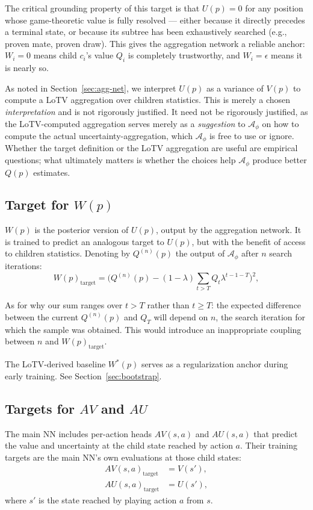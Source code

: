 \documentclass[11pt]{article}
\begin{document}
The critical grounding property of this target is that $U(p) = 0$ for any
position whose game-theoretic value is fully resolved --- either because it
directly precedes a terminal state, or because its subtree has been
exhaustively searched (e.g., proven mate, proven draw). This gives the
aggregation network a reliable anchor: $W_i = 0$ means child $c_i$'s value
$Q_i$ is completely trustworthy, and $W_i = \epsilon$ means it is nearly so.

As noted in Section~\ref{sec:agg-net}, we interpret $U(p)$ as a variance
of $V(p)$ to compute a LoTV aggregation over children statistics. This is
merely a chosen \textit{interpretation} and is not rigorously justified.
It need not be rigorously justified, as the LoTV-computed aggregation serves
merely as a \textit{suggestion} to $\mathcal{A}_\phi$ on how to compute the
actual uncertainty-aggregation, which $\mathcal{A}_\phi$ is free to use or
ignore. Whether the target definition or the LoTV aggregation are useful
are empirical questions; what ultimately matters is
whether the choices help $\mathcal{A}_\phi$ produce better $Q(p)$ estimates.

\subsection{Target for $W(p)$}
\label{sec:Wp}

$W(p)$ is the posterior version of $U(p)$, output by the aggregation network.
It is trained to predict an analogous target to $U(p)$, but with the benefit of
access to children statistics. Denoting by $Q^{(n)}(p)$ the output of
$\mathcal{A}_\phi$ after $n$ search iterations:
\[
  W(p)_{\text{target}} = \bigl(Q^{(n)}(p) - (1-\lambda)\sum_{t > T} Q_{t}\lambda^{t-1-T}\bigr)^2,
\]

As for why our sum ranges over $t > T$ rather than $t \geq T$: the expected
difference between the current $Q^{(n)}(p)$ and $Q_T$ will depend on $n$, the
search iteration for which the sample was obtained. This would introduce an
inappropriate coupling between $n$ and $W(p)_\text{target}$.

The LoTV-derived baseline $W^*(p)$ serves as a
regularization anchor during early training. See Section~\ref{sec:bootstrap}.

\subsection{Targets for $AV$ and $AU$}
\label{sec:AV}

The main NN includes per-action heads $AV(s, a)$ and $AU(s, a)$ that predict
the value and uncertainty at the child state reached by action $a$. Their
training targets are the main NN's own evaluations at those child states:
\begin{align*}
  AV(s, a)_{\text{target}} &= V(s'), \\
  AU(s, a)_{\text{target}} &= U(s'),
\end{align*}
where $s'$ is the state reached by playing action $a$ from $s$.
\end{document}
